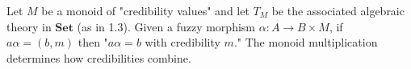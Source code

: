Let $M$ be a monoid of "credibility values" and let $T_M$ be the associated algebraic theory in $\mathbf{Set}$ (as in 1.3). Given a fuzzy morphism $\alpha : A \longrightarrow B \times M$, if $a\alpha = (b, m)$ then "$a\alpha = b$ with credibility $m$." The monoid multiplication determines how credibilities combine.
